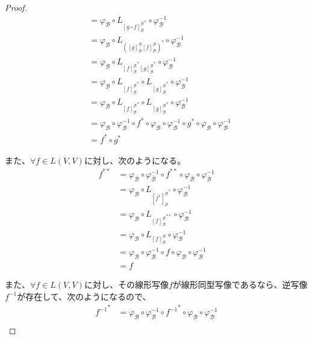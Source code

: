 \documentclass[dvipdfmx]{jsarticle}
\begin{document}
\begin{proof}
\begin{align*}
&= \varphi_{\mathcal{B}} \circ L_{{[ g \circ f]_{\mathcal{B}}^{\mathcal{B}}}^{*}} \circ \varphi_{\mathcal{B}}^{- 1}\\
&= \varphi_{\mathcal{B}} \circ L_{\left( [ g]_{\mathcal{B}}^{\mathcal{B}}[ f]_{\mathcal{B}}^{\mathcal{B}} \right)^{*}} \circ \varphi_{\mathcal{B}}^{- 1}\\
&= \varphi_{\mathcal{B}} \circ L_{{[ f]_{\mathcal{B}}^{\mathcal{B}}}^{*}{[ g]_{\mathcal{B}}^{\mathcal{B}}}^{*}} \circ \varphi_{\mathcal{B}}^{- 1}\\
&= \varphi_{\mathcal{B}} \circ L_{{[ f]_{\mathcal{B}}^{\mathcal{B}}}^{*}} \circ L_{{[ g]_{\mathcal{B}}^{\mathcal{B}}}^{*}} \circ \varphi_{\mathcal{B}}^{- 1}\\
&= \varphi_{\mathcal{B}} \circ L_{{[ f]_{\mathcal{B}}^{\mathcal{B}}}^{*}} \circ L_{{[ g]_{\mathcal{B}}^{\mathcal{B}}}^{*}} \circ \varphi_{\mathcal{B}}^{- 1}\\
&= \varphi_{\mathcal{B}} \circ \varphi_{\mathcal{B}}^{- 1} \circ f^{*} \circ \varphi_{\mathcal{B}} \circ \varphi_{\mathcal{B}}^{- 1} \circ g^{*} \circ \varphi_{\mathcal{B}} \circ \varphi_{\mathcal{B}}^{- 1}\\
&= f^{*} \circ g^{*}
\end{align*}\par
また、$\forall f \in L(V,V)$に対し、次のようになる。
\begin{align*}
f^{**} &= \varphi_{\mathcal{B}} \circ \varphi_{\mathcal{B}}^{- 1} \circ f^{**} \circ \varphi_{\mathcal{B}} \circ \varphi_{\mathcal{B}}^{- 1}\\
&= \varphi_{\mathcal{B}} \circ L_{{\left[ f^{*} \right]_{\mathcal{B}}^{\mathcal{B}}}^{*}} \circ \varphi_{\mathcal{B}}^{- 1}\\
&= \varphi_{\mathcal{B}} \circ L_{{[ f]_{\mathcal{B}}^{\mathcal{B}}}^{**}} \circ \varphi_{\mathcal{B}}^{- 1}\\
&= \varphi_{\mathcal{B}} \circ L_{[ f]_{\mathcal{B}}^{\mathcal{B}}} \circ \varphi_{\mathcal{B}}^{- 1}\\
&= \varphi_{\mathcal{B}} \circ \varphi_{\mathcal{B}}^{- 1} \circ f \circ \varphi_{\mathcal{B}} \circ \varphi_{\mathcal{B}}^{- 1}\\
&= f
\end{align*}\par
また、$\forall f \in L(V,V)$に対し、その線形写像$f$が線形同型写像であるなら、逆写像$f^{- 1}$が存在して、次のようになるので、
\begin{align*}
{f^{- 1}}^{*} &= \varphi_{\mathcal{B}} \circ \varphi_{\mathcal{B}}^{- 1} \circ {f^{- 1}}^{*} \circ \varphi_{\mathcal{B}} \circ \varphi_{\mathcal{B}}^{- 1}\\

\end{align*}
\end{proof}
\end{document}

